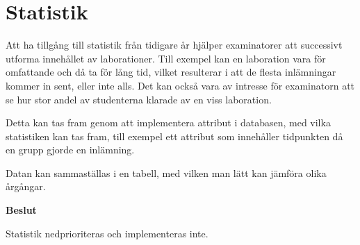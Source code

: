 \section{Statistik}

Att ha tillgång till statistik från tidigare år hjälper examinatorer att successivt utforma innehållet av laborationer. Till exempel kan en laboration vara för omfattande och då ta för lång tid, vilket resulterar i att de flesta inlämningar kommer in sent, eller inte alls. Det kan också vara av intresse för examinatorn att se hur stor andel av studenterna klarade av en viss laboration.  

Detta kan tas fram genom att implementera attribut i databasen, med vilka statistiken kan tas fram, till exempel ett attribut som innehåller tidpunkten då en grupp gjorde en inlämning.

Datan kan sammaställas i en tabell, med vilken man lätt kan jämföra olika årgångar.

\begin{flushright}
  
  \textbf{Beslut}
  
  Statistik nedprioriteras och implementeras inte.
  
\end{flushright}